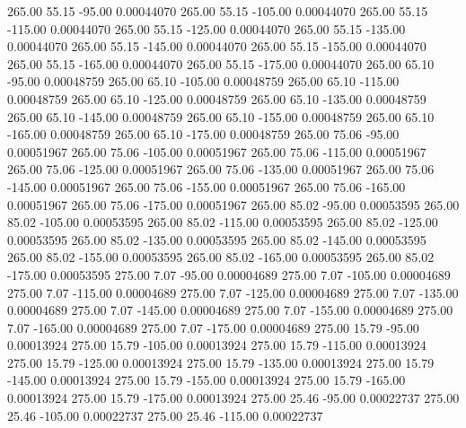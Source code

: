     265.00     55.15    -95.00     0.00044070
    265.00     55.15   -105.00     0.00044070
    265.00     55.15   -115.00     0.00044070
    265.00     55.15   -125.00     0.00044070
    265.00     55.15   -135.00     0.00044070
    265.00     55.15   -145.00     0.00044070
    265.00     55.15   -155.00     0.00044070
    265.00     55.15   -165.00     0.00044070
    265.00     55.15   -175.00     0.00044070
    265.00     65.10    -95.00     0.00048759
    265.00     65.10   -105.00     0.00048759
    265.00     65.10   -115.00     0.00048759
    265.00     65.10   -125.00     0.00048759
    265.00     65.10   -135.00     0.00048759
    265.00     65.10   -145.00     0.00048759
    265.00     65.10   -155.00     0.00048759
    265.00     65.10   -165.00     0.00048759
    265.00     65.10   -175.00     0.00048759
    265.00     75.06    -95.00     0.00051967
    265.00     75.06   -105.00     0.00051967
    265.00     75.06   -115.00     0.00051967
    265.00     75.06   -125.00     0.00051967
    265.00     75.06   -135.00     0.00051967
    265.00     75.06   -145.00     0.00051967
    265.00     75.06   -155.00     0.00051967
    265.00     75.06   -165.00     0.00051967
    265.00     75.06   -175.00     0.00051967
    265.00     85.02    -95.00     0.00053595
    265.00     85.02   -105.00     0.00053595
    265.00     85.02   -115.00     0.00053595
    265.00     85.02   -125.00     0.00053595
    265.00     85.02   -135.00     0.00053595
    265.00     85.02   -145.00     0.00053595
    265.00     85.02   -155.00     0.00053595
    265.00     85.02   -165.00     0.00053595
    265.00     85.02   -175.00     0.00053595
    275.00      7.07    -95.00     0.00004689
    275.00      7.07   -105.00     0.00004689
    275.00      7.07   -115.00     0.00004689
    275.00      7.07   -125.00     0.00004689
    275.00      7.07   -135.00     0.00004689
    275.00      7.07   -145.00     0.00004689
    275.00      7.07   -155.00     0.00004689
    275.00      7.07   -165.00     0.00004689
    275.00      7.07   -175.00     0.00004689
    275.00     15.79    -95.00     0.00013924
    275.00     15.79   -105.00     0.00013924
    275.00     15.79   -115.00     0.00013924
    275.00     15.79   -125.00     0.00013924
    275.00     15.79   -135.00     0.00013924
    275.00     15.79   -145.00     0.00013924
    275.00     15.79   -155.00     0.00013924
    275.00     15.79   -165.00     0.00013924
    275.00     15.79   -175.00     0.00013924
    275.00     25.46    -95.00     0.00022737
    275.00     25.46   -105.00     0.00022737
    275.00     25.46   -115.00     0.00022737
